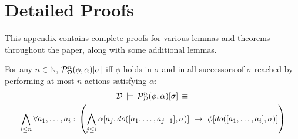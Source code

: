 

\chapter{Detailed Proofs}

\label{ch:proofs}

This appendix contains complete proofs for various lemmas and theorems
throughout the paper, along with some additional lemmas.\medskip{}


\begin{thmext}
[\ref{thm:PstN-works}] For any $n\in\mathbb{N}$, $\mathcal{P}_{\mathcal{D}}^{n}(\phi,\alpha)[\sigma]$
iff $\phi$ holds in $\sigma$ and in all successors of $\sigma$
reached by performing at most $n$ actions satisfying $\alpha$:\begin{multline*}
\mathcal{D}\,\models\,\mathcal{P}_{\mathcal{D}}^{n}(\phi,\alpha)[\sigma]\,\equiv\,\\
\bigwedge_{i\leq n}\forall a_{1},\dots,a_{i}:\,\left(\bigwedge_{j\leq i}\alpha[a_{j},do([a_{1},\dots,a_{j-1}],\sigma)]\,\,\rightarrow\,\,\phi[do([a_{1},\dots,a_{i}],\sigma)]\right)\end{multline*}

\end{thmext}
